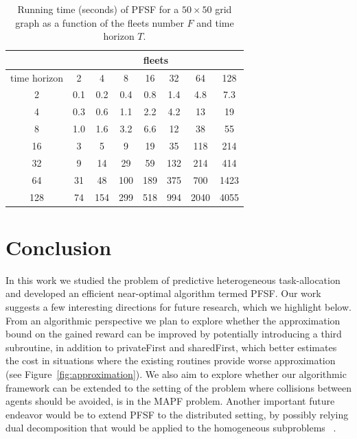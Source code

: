 \documentclass[conference]{IEEEtran}
\begin{document}
\begin{table}[]
\centering
\begin{tabular}{c|c|c|c|c|c|c|c|}
\cline{2-8}
                                   & \multicolumn{7}{c|}{fleets}    \\ \hline
\multicolumn{1}{|L||}{time horizon} & 2 & 4 & 8 & 16 & 32 & 64 & 128 \\ \hline \hline
\multicolumn{1}{|c||}{2}            & 0.1 & 0.2 & 0.4 & 0.8 & 1.4 & 4.8 & 7.3  \\ \hline
\multicolumn{1}{|c||}{4}            & 0.3 & 0.6 & 1.1 & 2.2 & 4.2 & 13 & 19  \\ \hline
\multicolumn{1}{|c||}{8}            &  1.0 & 1.6 & 3.2 & 6.6 & 12 & 38 & 55  \\ \hline
\multicolumn{1}{|c||}{16}           &  3 & 5 & 9 & 19 & 35 & 118 & 214   \\ \hline
\multicolumn{1}{|c||}{32}           &   9 & 14 & 29 & 59 & 132 & 214 & 414  \\ \hline
\multicolumn{1}{|c||}{64}           &   31 & 48 & 100 & 189 & 375 & 700 & 1423  \\ \hline
\multicolumn{1}{|c||}{128}          &  74 & 154 & 299 & 518 & 994 & 2040 & 4055   \\ \hline
\end{tabular}
\vspace{5pt}
\caption{Running time (seconds) of PFSF for a $50\times 50$ grid graph as a function of the fleets number $F$ and time horizon $T$. \label{tbl:pfsf}}
\end{table}

\section{Conclusion}
In this work we studied the problem of predictive heterogeneous task-allocation and developed an efficient near-optimal algorithm termed PFSF. Our work suggests a few interesting directions for future research, which we highlight below. From an algorithmic perspective we plan to explore whether the approximation bound on the gained reward can be improved by potentially introducing a third subroutine, in addition to privateFirst and sharedFirst, which better estimates the cost in situations where the existing routines provide worse approximation (see Figure~\ref{fig:approximation}). We also aim to explore whether our algorithmic framework can be extended to the setting of the problem where collisions between agents should be avoided, is in the MAPF problem. Another important future endeavor would be to extend PFSF to the distributed setting, by possibly relying dual decomposition that would be applied to the homogeneous subproblems ~\cite[Chapter~7]{Ref:Bertsekas2016Nonlinear}.
\end{document}
